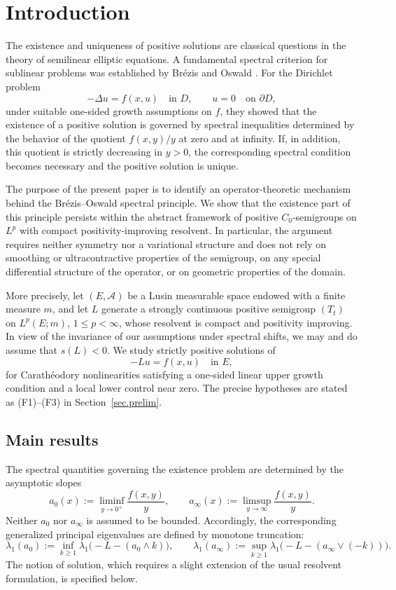 \documentclass[11pt,a4paper,reqno]{amsart}
\theoremstyle{definition}
\numberwithin{equation}{section}
\begin{document}
\section{Introduction}
\label{sec1}

The existence and uniqueness of positive solutions are classical questions in the theory
of semilinear elliptic equations. A fundamental spectral criterion for
sublinear problems was established by Br\'ezis and Oswald
\cite{BrezisOswald1986}. For the Dirichlet problem
\[
-\Delta u=f(x,u)\quad\text{in }D,
\qquad
u=0\quad\text{on }\partial D,
\]
under suitable one-sided growth assumptions on $f$, they showed that
the existence of a positive solution is governed by spectral inequalities determined by the
behavior of the quotient $f(x,y)/y$ at zero and at infinity. If, in addition,
this quotient is strictly decreasing in $y>0$, the corresponding spectral condition
becomes necessary and the positive solution is unique.

The purpose of the present paper is to identify an operator-theoretic
mechanism behind the Br\'ezis--Oswald spectral principle. 
We show that the existence part of this principle persists within the abstract framework of positive $C_0$-semigroups
on $L^p$ with compact positivity-improving resolvent. In particular,
the argument requires neither symmetry nor a variational structure and
does not rely on smoothing or ultracontractive properties of the semigroup,
on any special differential structure of the operator, or on geometric
properties of the domain.


More precisely, let $(E,\mathcal A)$ be a Lusin measurable space endowed
with a finite measure $m$, and let $L$ generate a strongly continuous
positive semigroup $(T_t)$ on $L^p(E;m)$, $1\le p<\infty$, whose resolvent is
compact and positivity improving. In view of the invariance of our assumptions under spectral shifts,
we may and do assume that $s(L)<0$. We study strictly positive
solutions of
\begin{equation}\label{eq1.1}
    -Lu=f(x,u)\quad\text{in }E,
\end{equation}
for Carath\'eodory nonlinearities satisfying a one-sided linear upper
growth condition and a local lower control near zero. The precise
hypotheses are stated as \textup{(F1)--(F3)} in
Section~\ref{sec.prelim}.


\subsection{Main results}
The spectral quantities governing the existence problem are determined by
the asymptotic slopes
\[
a_0(x)
:=
\liminf_{y\to0^+}\frac{f(x,y)}{y},
\qquad
a_\infty(x)
:=
\limsup_{y\to\infty}\frac{f(x,y)}{y}.
\]
Neither $a_0$ nor $a_\infty$ is assumed to be bounded. Accordingly, the
corresponding generalized principal eigenvalues are defined by monotone
truncation:
\[
\lambda_1(a_0)
:=
\inf_{k\geq1}
\lambda_1\bigl(-L-(a_0\wedge k)\bigr),
\qquad 
\lambda_1(a_\infty)
:=
\sup_{k\geq1}
\lambda_1\bigl(-L-(a_\infty\vee(-k))\bigr).
\]
The notion of solution, which requires a slight extension of the usual
resolvent formulation, is specified below.
\end{document}
